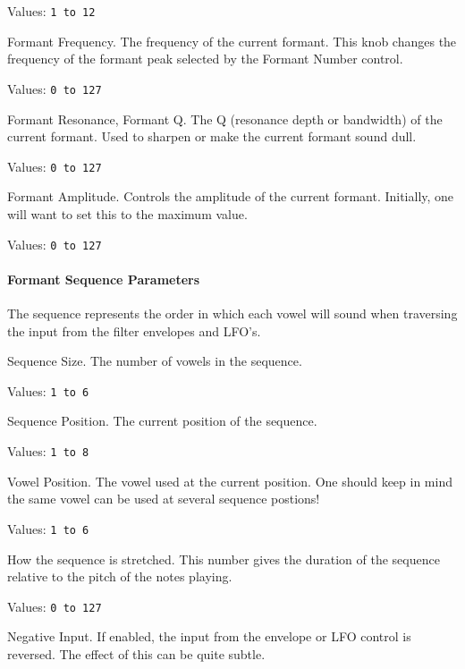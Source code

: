    Values:  \texttt{1 to 12}

   Formant Frequency.
   The frequency of the current formant.
   This knob changes the frequency of the formant peak selected by the
   Formant Number control.

   Values:  \texttt{0 to 127}

   Formant Resonance, Formant Q.
   The Q (resonance depth or bandwidth) of the current formant.
   Used to sharpen or make the current formant sound dull.

   Values:  \texttt{0 to 127}

   Formant Amplitude.
   Controls the amplitude of the current formant.
   Initially, one will want to set this to the maximum value.

   Values:  \texttt{0 to 127}

\paragraph{Formant Sequence Parameters}
\label{paragraph:formant_sequence_parameters}

   The sequence represents the order in which each vowel will sound when
   traversing the input from the filter envelopes and LFO's.

   Sequence Size.
   The number of vowels in the sequence.

   Values:  \texttt{1 to 6}

   Sequence Position.
   The current position of the sequence.

   Values:  \texttt{1 to 8}

   Vowel Position.
   The vowel used at the current position. One should keep in mind the same
   vowel can be used at several sequence postions!

   Values:  \texttt{1 to 6}

   How the sequence is stretched.
   This number gives the duration of the sequence relative to
   the pitch of the notes playing.

   Values:  \texttt{0 to 127}

   Negative Input.
   If enabled, the input from the envelope or LFO control is reversed. The effect of this can be quite subtle.


